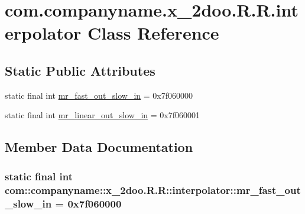 \hypertarget{classcom_1_1companyname_1_1x__2doo_1_1_r_1_1interpolator}{
\section{com.companyname.x\_\-2doo.R.R.interpolator Class Reference}
\label{classcom_1_1companyname_1_1x__2doo_1_1_r_1_1interpolator}
}
\subsection*{Static Public Attributes}
\begin{CompactItemize}
\item 
static final int \hyperlink{classcom_1_1companyname_1_1x__2doo_1_1_r_1_1interpolator_e41981b81b7a8b8075c88d52366b8a18}{mr\_\-fast\_\-out\_\-slow\_\-in} = 0x7f060000
\item 
static final int \hyperlink{classcom_1_1companyname_1_1x__2doo_1_1_r_1_1interpolator_9f0a54e89315def955b203bb3e8e6045}{mr\_\-linear\_\-out\_\-slow\_\-in} = 0x7f060001
\end{CompactItemize}


\subsection{Member Data Documentation}
\hypertarget{classcom_1_1companyname_1_1x__2doo_1_1_r_1_1interpolator_e41981b81b7a8b8075c88d52366b8a18}{
\subsubsection[{mr\_\-fast\_\-out\_\-slow\_\-in}]{\setlength{\rightskip}{0pt plus 5cm}static final int com::companyname::x\_\-2doo.R.R::interpolator::mr\_\-fast\_\-out\_\-slow\_\-in = 0x7f060000}}
\label{classcom_1_1companyname_1_1x__2doo_1_1_r_1_1interpolator_e41981b81b7a8b8075c88d52366b8a18}



